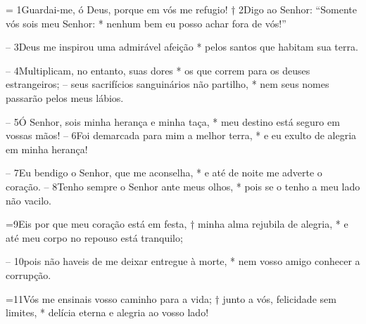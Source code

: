 = 1Guardai-me, ó Deus, porque em vós me refugio! † 
2Digo ao Senhor: “Somente vós sois meu Senhor: * 
nenhum bem eu posso achar fora de vós!” 

– 3Deus me inspirou uma admirável afeição * 
pelos santos que habitam sua terra. 

– 4Multiplicam, no entanto, suas dores * 
os que correm para os deuses estrangeiros; 
– seus sacrifícios sanguinários não partilho, * 
nem seus nomes passarão pelos meus lábios. 

– 5Ó Senhor, sois minha herança e minha taça, * 
meu destino está seguro em vossas mãos! 
– 6Foi demarcada para mim a melhor terra, * 
e eu exulto de alegria em minha herança! 

– 7Eu bendigo o Senhor, que me aconselha, * 
e até de noite me adverte o coração. 
– 8Tenho sempre o Senhor ante meus olhos, * 
pois se o tenho a meu lado não vacilo. 

=9Eis por que meu coração está em festa, † 
minha alma rejubila de alegria, * 
e até meu corpo no repouso está tranquilo; 

– 10pois não haveis de me deixar entregue à morte, * 
nem vosso amigo conhecer a corrupção. 

=11Vós me ensinais vosso caminho para a vida; † 
junto a vós, felicidade sem limites, *
delícia eterna e alegria ao vosso lado! 